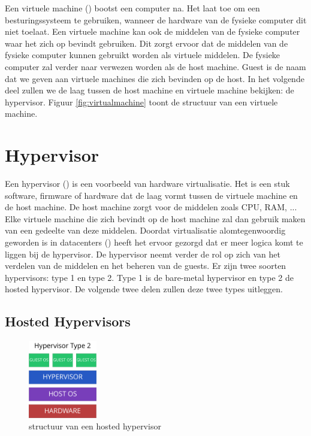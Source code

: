 \documentclass[pdftex,a4paper,12pt,twoside]{report}
\begin{document}
Een virtuele machine (\cite{smith_architecture_2005}) bootst een computer na. Het laat toe om een besturingssysteem te gebruiken, wanneer de hardware van de fysieke computer dit niet toelaat. Een virtuele machine kan ook de middelen van de fysieke computer waar het zich op bevindt gebruiken. Dit zorgt ervoor dat de middelen van de fysieke computer kunnen gebruikt worden als virtuele middelen. De fysieke computer zal verder naar verwezen worden als de host machine. Guest is de naam dat we geven aan virtuele machines die zich bevinden op de host. In het volgende deel zullen we de laag tussen de host machine en virtuele machine bekijken: de hypervisor. Figuur \ref{fig:virtualmachine} toont de structuur van een virtuele machine. 

\section{Hypervisor}

Een hypervisor (\cite{popek_formal_1974}) is een voorbeeld van hardware virtualisatie. Het is een stuk software, firmware of hardware dat de laag vormt tussen de virtuele machine en de host machine. De host machine zorgt voor de middelen zoals CPU, RAM, ... Elke virtuele machine die zich bevindt op de host machine zal dan gebruik maken van een gedeelte van deze middelen. Doordat virtualisatie alomtegenwoordig geworden is in datacenters (\cite{soundararajan_impact_2010}) heeft het ervoor gezorgd dat er meer logica komt te liggen bij de hypervisor. De hypervisor neemt verder de rol op zich van het verdelen van de middelen en het beheren van de guests. Er zijn twee soorten hypervisors: type 1 en type 2. Type 1 is de bare-metal hypervisor en type 2 de hosted hypervisor. De volgende twee delen zullen deze twee types uitleggen.

\newpage

\subsection{Hosted Hypervisors}

\begin{figure}
    \centering
    \includegraphics[width=3cm]{img/hypervisor-2}
    \caption{structuur van een hosted hypervisor}
    \label{fig:hypervisor-2}
\end{figure}
\end{document}
